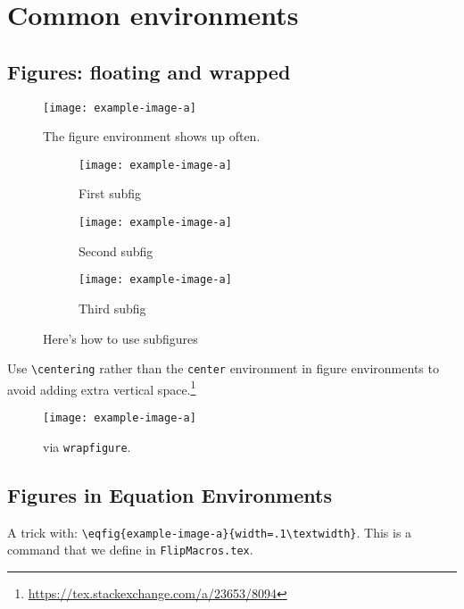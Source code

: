 
\section{Common environments}

\subsection{Figures: floating and wrapped}

\begin{figure}%
    \centering
    \texttt{[image: example-image-a]}
    \caption{The figure environment shows up often.}
    \label{fig:figure:example}
\end{figure}


\begin{figure}%
    \centering
	\begin{subfigure}{0.3\textwidth}
    \centering
        \texttt{[image: example-image-a]}
        \caption{First subfig}
        \label{fig:subfig:1}
    \end{subfigure}\;%
    \begin{subfigure}{0.3\textwidth}
    \centering
        \texttt{[image: example-image-a]}
        \caption{Second subfig}
        \label{fig:subfig:2}
    \end{subfigure}\;%
    \begin{subfigure}{0.3\textwidth}
    \centering
        \texttt{[image: example-image-a]}
        \caption{Third subfig}
        \label{fig:subfig:3}
    \end{subfigure}%
    \caption{Here's how to use subfigures}
    \label{fig:subfigure:example}
\end{figure}

Use 
\verb!\centering!
rather than the \texttt{center} environment in figure environments to avoid adding extra vertical space.\footnote{\url{https://tex.stackexchange.com/a/23653/8094}\label{foot:centering}}

\begin{wrapfigure}{l}{0.3\textwidth}
	\texttt{[image: example-image-a]}
	\caption{via \texttt{wrapfigure}.}
	\label{fig:wrapfig}
\end{wrapfigure}
\lipsum[1]

\subsection{Figures in Equation Environments}
\label{sec:figs}
A trick with: \verb!\eqfig{example-image-a}{width=.1\textwidth}!. This is a command that we define in \texttt{FlipMacros.tex}.

